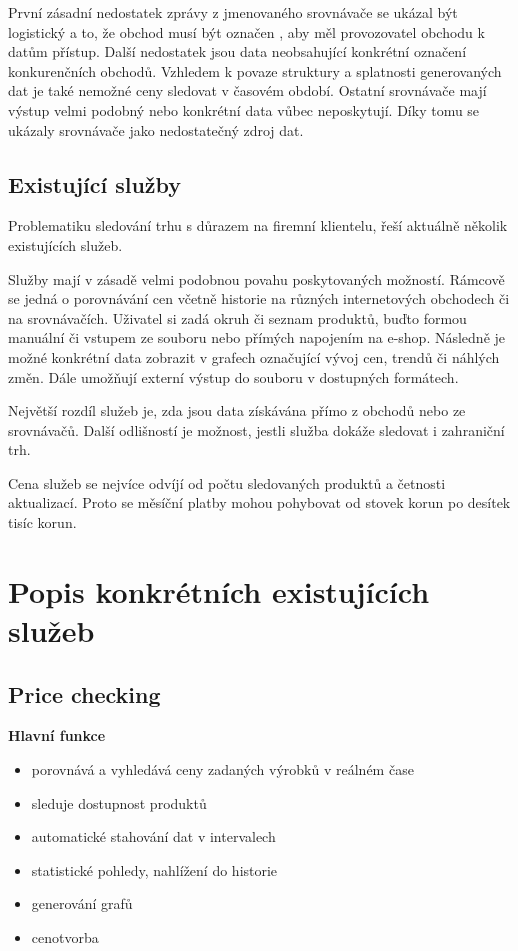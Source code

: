 \documentclass[thesis=B,czech]{FITthesis}[2012/06/26]
\begin{document}
První zásadní nedostatek zprávy z jmenovaného srovnávače se ukázal být logistický a to, že obchod musí být označen ,
aby měl provozovatel obchodu k datům přístup. Další nedostatek jsou data neobsahující konkrétní označení konkurenčních obchodů.\cite{heureka-report}
Vzhledem k povaze struktury a splatnosti generovaných dat je také nemožné ceny sledovat v časovém období.
Ostatní srovnávače mají výstup velmi podobný nebo konkrétní data vůbec neposkytují. Díky tomu se ukázaly
srovnávače jako nedostatečný zdroj dat.\cite{hunka}


\subsection{Existující služby}

Problematiku sledování trhu s důrazem na firemní klientelu, řeší aktuálně několik existujících služeb.
\par
Služby mají v zásadě velmi podobnou povahu poskytovaných možností. Rámcově se jedná o porovnávání cen včetně historie na různých internetových
obchodech či na srovnávačích. Uživatel si zadá okruh či seznam produktů, buďto formou manuální či vstupem ze souboru nebo 
přímých napojením na e-shop. Následně je možné konkrétní data zobrazit v grafech označující vývoj cen, trendů či náhlých změn.
Dále umožňují externí výstup do souboru v dostupných formátech.
\par
Největší rozdíl služeb je, zda jsou data získávána přímo z obchodů nebo ze srovnávačů. Další odlišností je 
možnost, jestli služba dokáže sledovat i zahraniční trh.
\par
Cena služeb se nejvíce odvíjí od počtu sledovaných produktů a četnosti aktualizací. Proto se měsíční platby mohou 
pohybovat od stovek korun po desítek tisíc korun.

\section{Popis konkrétních existujících služeb}

\subsection{Price checking\cite{priceChecking}} 


\textbf{Hlavní funkce}
\begin{itemize}
\item porovnává a vyhledává ceny zadaných výrobků v reálném čase
\item sleduje dostupnost produktů
\item automatické stahování dat v intervalech
\item statistické pohledy, nahlížení do historie
\item generování grafů
\item cenotvorba
\end{itemize}
\end{document}
